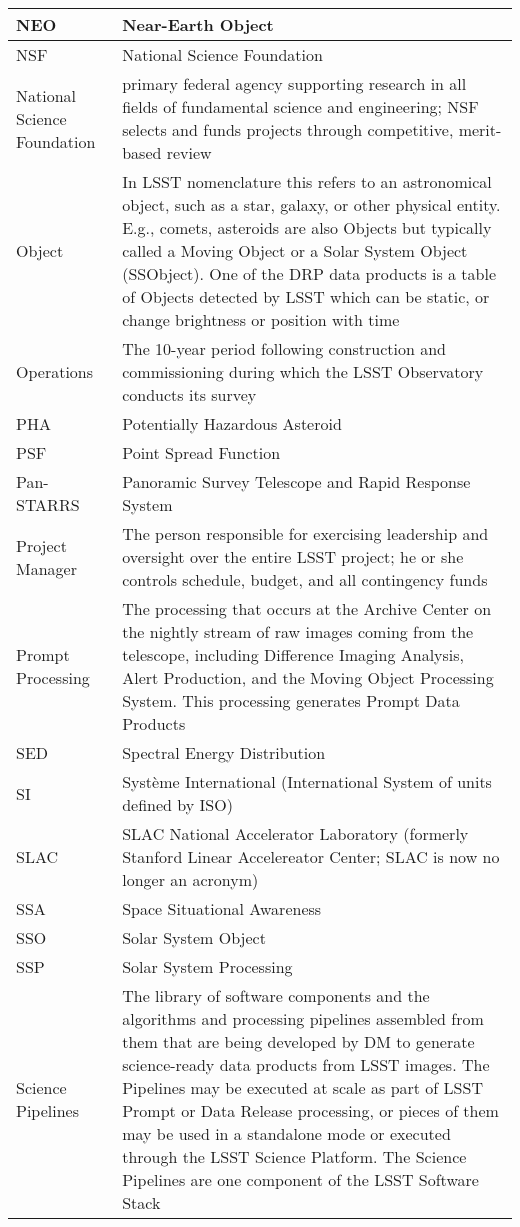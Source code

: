 \begin{longtable}{|p{}|p{}|}
NEO & Near-Earth \gls{Object} \\\hline
NSF & \gls{National Science Foundation} \\\hline
National Science Foundation & primary federal agency supporting research in all fields of fundamental science and engineering; \gls{NSF} selects and funds projects through competitive, merit-based review \\\hline
Object & In \gls{LSST} nomenclature this refers to an \gls{astronomical object}, such as a star, galaxy, or other physical entity. E.g., comets, asteroids are also Objects but typically called a Moving \gls{Object} or a Solar System \gls{Object} (SSObject). One of the \gls{DRP} data products is a table of Objects detected by \gls{LSST} which can be static, or change brightness or position with time \\\hline
Operations & The 10-year period following construction and commissioning during which the \gls{LSST} Observatory conducts its survey \\\hline
PHA & Potentially Hazardous Asteroid \\\hline
PSF & Point Spread Function \\\hline
Pan-STARRS & Panoramic Survey Telescope and Rapid Response System \\\hline
Project Manager & The person responsible for exercising leadership and oversight over the entire \gls{LSST} project; he or she controls schedule, budget, and all contingency funds \\\hline
Prompt Processing & The processing that occurs at the \gls{Archive} \gls{Center} on the nightly stream of raw images coming from the telescope, including Difference Imaging Analysis, \gls{Alert} Production, and the Moving \gls{Object} Processing System. This processing generates Prompt Data Products \\\hline
SED & \gls{Spectral Energy Distribution} \\\hline
SI & Syst\`eme International (International System of units defined by ISO) \\\hline
SLAC & \gls{SLAC} National Accelerator Laboratory (formerly Stanford Linear Accelereator \gls{Center}; \gls{SLAC} is now no longer an acronym) \\\hline
SSA & Space Situational Awareness \\\hline
SSO & Solar System \gls{Object} \\\hline
SSP & Solar System Processing \\\hline
Science Pipelines & The library of software components and the algorithms and processing pipelines assembled from them that are being developed by \gls{DM} to generate science-ready data products from \gls{LSST} images. The Pipelines may be executed at scale as part of \gls{LSST} Prompt or \gls{Data Release} processing, or pieces of them may be used in a standalone mode or executed through the \gls{LSST} \gls{Science Platform}. The \gls{Science Pipelines} are one component of the \gls{LSST} \gls{Software Stack} \\\hline

\end{longtable}
